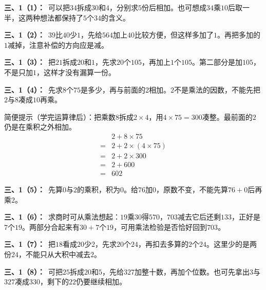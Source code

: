 \documentclass[multi=snippet,border=0pt]{standalone}
\newenvironment{snippet}[3]{\begin{minipage}{#1bp}\color{answerred}\fontsize{#2}{#3}\selectfont\raggedright}{\end{minipage}}
\begin{document}
\begin{snippet}{505}{11.5}{14}\textbf{三、1（1）：}\ 可以把\(34\)拆成\(30\)和\(4\)，分别求\(5\)份后相加。也可想成\(34\)乘\(10\)后取一半，这两种想法都保持了\(5\)个\(34\)的含义。\end{snippet}
\begin{snippet}{505}{11.5}{14}\textbf{三、1（2）：}\ \(39\)比\(40\)少\(1\)，先给\(564\)加上\(40\)比较方便，但这样多加了\(1\)。再把多加的\(1\)减掉，注意补偿的方向应是减。\end{snippet}
\begin{snippet}{505}{11.5}{14}\textbf{三、1（3）：}\ 把\(21\)拆成\(20\)和\(1\)，先求\(20\)个\(105\)，再加上\(1\)个\(105\)。第二部分是加\(105\)，不是只加\(1\)，这样才没有漏算一份。\end{snippet}
\begin{snippet}{505}{11.5}{14}\textbf{三、1（4）：}\ 先求\(8\)个\(75\)是多少，再与前面的\(2\)相加。\(2\)不是乘法的因数，不能先把\(2\)与\(8\)凑成\(10\)再乘。\par 简便提示（学完运算律后）：把乘数\(8\)拆成\(2\times4\)，用\(4\times75=300\)凑整。最前面的\(2\)仍是在乘积之外相加。\[\begin{aligned}&2+8\times75\\={}&2+2\times(4\times75)\\={}&2+2\times300\\={}&2+600\\={}&602\end{aligned}\]\end{snippet}
\begin{snippet}{505}{11.5}{14}\textbf{三、1（5）：}\ 先算\(0\)与\(2\)的乘积，积为\(0\)。给\(76\)加\(0\)，原数不变，不能先算\(76+0\)后再乘\(2\)。\end{snippet}
\begin{snippet}{505}{11.5}{14}\textbf{三、1（6）：}\ 求商时可从乘法想起：\(19\)乘\(30\)得\(570\)，\(703\)减去它后还剩\(133\)，正好是\(7\)个\(19\)。两部分合起来有\(30+7\)个\(19\)，可用乘法检验是否恰好回到\(703\)。\end{snippet}
\begin{snippet}{505}{11.5}{14}\textbf{三、1（7）：}\ 把\(18\)看成\(20\)少\(2\)，先求\(20\)个\(24\)，再扣去多算的\(2\)个\(24\)。这里少的是两份\(24\)，不能只从大积中减去\(2\)。\end{snippet}
\begin{snippet}{505}{11.5}{14}\textbf{三、1（8）：}\ 可把\(25\)拆成\(20\)和\(5\)，先给\(327\)加整十数，再加个位数。也可先拿出\(3\)与\(327\)凑成\(330\)，剩下的\(22\)仍要继续相加。\end{snippet}
\end{document}
